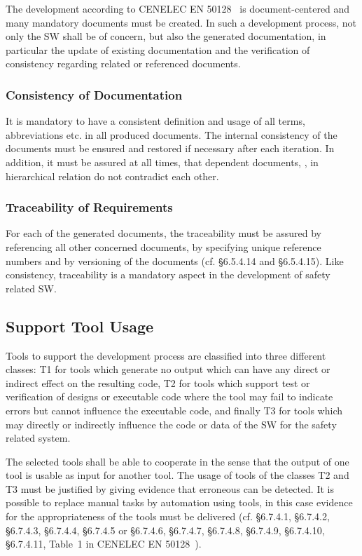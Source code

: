 The development according to CENELEC EN 50128~\cite{EN-50128} is
document-centered and many mandatory documents must be created.  In such a
development process, not only the SW shall be of concern, but also the generated
documentation, in particular the update of existing documentation and the
verification of consistency regarding related or referenced documents.

\subsubsection{Consistency of Documentation}
\label{sec:cons-docum}

It is mandatory to have a consistent definition and usage of all terms,
abbreviations etc. in all produced documents. The internal consistency of the
documents must be ensured and restored if necessary after each iteration. In
addition, it must be assured at all times, that dependent documents, \ie, in
hierarchical relation do not contradict each other.

\subsubsection{Traceability of Requirements}
\label{sec:trac-requ}

For each of the generated documents, the traceability must be assured by
referencing all other concerned documents, by specifying unique reference
numbers and by versioning of the documents (cf. §6.5.4.14 and §6.5.4.15). Like
consistency, traceability is a mandatory aspect in the development of safety
related SW.

\subsection{Support Tool Usage}
\label{sec:tool-usage}

Tools to support the development process are classified into three different
classes: T1 for tools which generate no output which can have any direct or
indirect effect on the resulting code, T2 for tools which support test or
verification of designs or executable code where the tool may fail to indicate
errors but cannot influence the executable code, and finally T3 for tools which
may directly or indirectly influence the code or data of the SW for the safety
related system.

The selected tools shall be able to cooperate in the sense that the output of
one tool is usable as input for another tool. The usage of tools of the classes
T2 and T3 must be justified by giving evidence that erroneous can be
detected. It is possible to replace manual tasks by automation using tools, in
this case evidence for the appropriateness of the tools must be delivered (cf.
§6.7.4.1, §6.7.4.2, §6.7.4.3, §6.7.4.4, §6.7.4.5 or §6.7.4.6, §6.7.4.7,
§6.7.4.8, §6.7.4.9, §6.7.4.10, §6.7.4.11, Table~1 in CENELEC EN
50128~\cite{EN-50128}).


